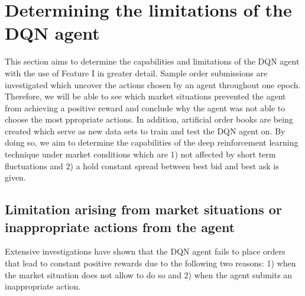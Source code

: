 \section{Determining the limitations of the DQN agent}
\label{sec:eval-dqn-limitations}
This section aims to determine the capabilities and limitations of the DQN agent with the use of Feature I in greater detail.
Sample order submissions are investigated which uncover the actions chosen by an agent throughout one epoch.
Therefore, we will be able to see which market situations prevented the agent from achieving a positive reward and conclude why the agent was not able to choose the most ppropriate actions.
In addition, artificial order books are being created which serve as new data sets to train and test the DQN agent on.
By doing so, we aim to determine the capabilities of the deep reinforcement learning technique under market conditions which are 1) not affected by short term fluctuations and 2) a hold constant spread between best bid and best ask is given.

\subsection{Limitation arising from market situations or inappropriate actions from the agent}
Extensive investigations have shown that the DQN agent fails to place orders that lead to constant positive rewards due to the following two reasons: 1) when the market situation does not allow to do so and 2) when the agent submits an inappropriate action.


